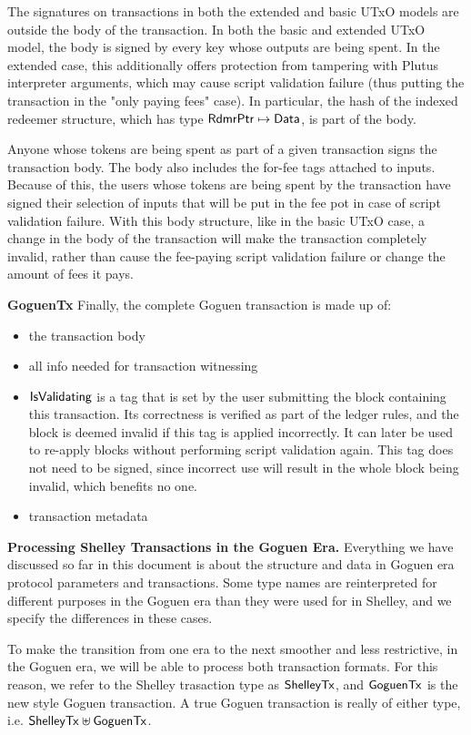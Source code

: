 The signatures on transactions in both the extended and basic UTxO models
are outside the body of the transaction.
In both the basic and extended UTxO model, the body is signed by every key
whose outputs are being spent. In the extended case, this additionally offers
protection from tampering with Plutus interpreter arguments, which may cause
script validation failure (thus putting the transaction in the "only paying fees" case).
In particular, the hash of the indexed redeemer structure, which has type
$\mathsf{RdmrPtr} \mapsto \mathsf{Data}$, is part of the body.

Anyone whose tokens are being spent as part of a given transaction
signs the transaction body. The body also includes the for-fee tags attached to inputs.
Because of this, the users whose tokens are being spent by the transaction have
signed their selection of
inputs that will be put in the fee pot in case of script validation failure.
With this body structure, like in the basic UTxO case, a change in the body of the transaction
will make the transaction completely invalid, rather than cause the fee-paying script validation
failure or change the amount of fees it pays.

\textbf{GoguenTx}
Finally, the complete Goguen transaction is made up of:

\begin{itemize}
  \item the transaction body
  \item all info needed for transaction witnessing
  \item $\mathsf{IsValidating}$ is a tag that is
  set by the user submitting the block containing this transaction.
  Its correctness is verified as part of the ledger rules, and the block is
  deemed invalid if this tag is applied incorrectly.
  It can later be used to re-apply blocks without performing script validation
  again. This tag does not need to be signed, since incorrect use will result
  in the whole block being invalid, which benefits no one.
  \item transaction metadata
\end{itemize}

\textbf{Processing Shelley Transactions in the Goguen Era.}
Everything we have discussed so far in this document is about the structure and data
in Goguen era protocol parameters and transactions. Some type names are reinterpreted
for different purposes in the Goguen era than they were used for in Shelley, and
we specify the differences in these cases.

To make the transition from one era to the next smoother and less restrictive,
in the Goguen era, we will be able to process both transaction formats.
For this reason, we refer to the Shelley
trasaction type as $\mathsf{ShelleyTx}$, and $\mathsf{GoguenTx}$ is the new style Goguen transaction.
A true Goguen transaction is really of either type,
i.e. $\mathsf{ShelleyTx} \uplus \mathsf{GoguenTx}$.

